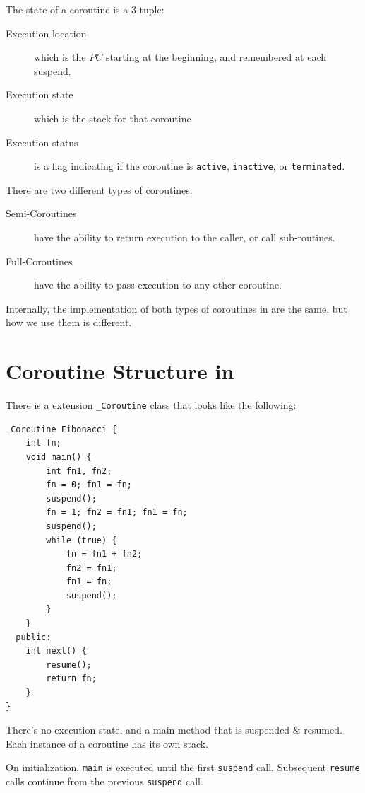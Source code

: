        The state of a coroutine is a 3-tuple:
        \begin{description}
            \item[Execution location] which is the $PC$ starting at the beginning, and remembered at each suspend.
            \item[Execution state] which is the stack for that coroutine
            \item[Execution status] is a flag indicating if the coroutine is \verb|active|, \verb|inactive|, or \verb|terminated|.
        \end{description}
        There are two different types of coroutines:
        \begin{description}
            \item[Semi-Coroutines] have the ability to return execution to the caller, or call sub-routines.
            \item[Full-Coroutines] have the ability to pass execution to any other coroutine.
        \end{description}

        Internally, the implementation of both types of coroutines in \uC are the same, but how we use them is different.

        \section{Coroutine Structure in \uC} %
        \label{sec:coroutine_structure_in_uc}

            There is a \uC extension \verb|_Coroutine| class that looks like the following:
                \begin{lstlisting}
_Coroutine Fibonacci {
    int fn;
    void main() {
        int fn1, fn2;
        fn = 0; fn1 = fn;
        suspend();
        fn = 1; fn2 = fn1; fn1 = fn;
        suspend();
        while (true) {
            fn = fn1 + fn2;
            fn2 = fn1;
            fn1 = fn;
            suspend();
        }
    }
  public:
    int next() {
        resume();
        return fn;
    }
}
                \end{lstlisting}
            There's no execution state, and a main method that is suspended \& resumed.
            Each instance of a coroutine has its own stack.

            On initialization, \verb|main| is executed until the first \verb|suspend| call.
            Subsequent \verb|resume| calls continue from the previous \verb|suspend| call.

